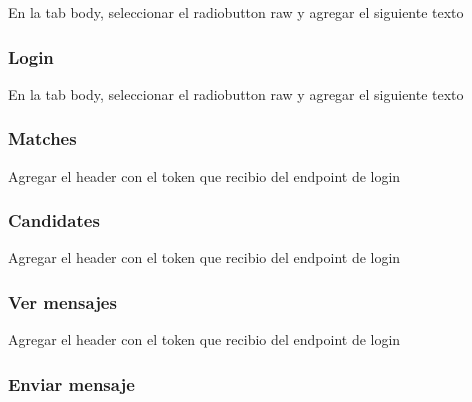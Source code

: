 \documentclass[letterpaper,10pt,english]{sphinxmanual}
\begin{document}
En la tab body, seleccionar el radiobutton raw y agregar el siguiente texto



\subsubsection{Login}
\label{manuals:id3}

En la tab body, seleccionar el radiobutton raw y agregar el siguiente texto



\subsubsection{Matches}
\label{manuals:matches}

Agregar el header con el token que recibio del endpoint de login



\subsubsection{Candidates}
\label{manuals:candidates}

Agregar el header con el token que recibio del endpoint de login



\subsubsection{Ver mensajes}
\label{manuals:ver-mensajes}

Agregar el header con el token que recibio del endpoint de login



\subsubsection{Enviar mensaje}
\label{manuals:enviar-mensaje}

\end{document}
